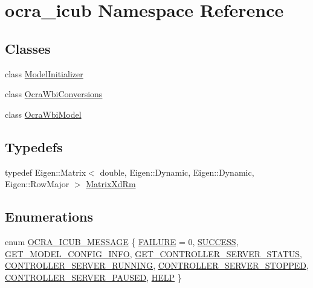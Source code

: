 \hypertarget{namespaceocra__icub}{}\section{ocra\+\_\+icub Namespace Reference}
\label{namespaceocra__icub}
\subsection*{Classes}
\begin{DoxyCompactItemize}
\item 
class \hyperlink{classocra__icub_1_1ModelInitializer}{Model\+Initializer}
\item 
class \hyperlink{classocra__icub_1_1OcraWbiConversions}{Ocra\+Wbi\+Conversions}
\item 
class \hyperlink{classocra__icub_1_1OcraWbiModel}{Ocra\+Wbi\+Model}
\end{DoxyCompactItemize}
\subsection*{Typedefs}
\begin{DoxyCompactItemize}
\item 
typedef Eigen\+::\+Matrix$<$ double, Eigen\+::\+Dynamic, Eigen\+::\+Dynamic, Eigen\+::\+Row\+Major $>$ \hyperlink{namespaceocra__icub_aa5e36a19ed031c28ca83c207bd7dd83f}{Matrix\+Xd\+Rm}
\end{DoxyCompactItemize}
\subsection*{Enumerations}
\begin{DoxyCompactItemize}
\item 
enum \hyperlink{namespaceocra__icub_afbd2db66b68005fb7cfac19210caf83f}{O\+C\+R\+A\+\_\+\+I\+C\+U\+B\+\_\+\+M\+E\+S\+S\+A\+GE} \{ \newline
\hyperlink{namespaceocra__icub_afbd2db66b68005fb7cfac19210caf83faa0c1832978fad84ef108d48265af68d2}{F\+A\+I\+L\+U\+RE} = 0, 
\hyperlink{namespaceocra__icub_afbd2db66b68005fb7cfac19210caf83fa67c96e3afcb39533f69c97dc5e9734e5}{S\+U\+C\+C\+E\+SS}, 
\hyperlink{namespaceocra__icub_afbd2db66b68005fb7cfac19210caf83fae8fe02f5f3b1b11d4749e720b9ec3636}{G\+E\+T\+\_\+\+M\+O\+D\+E\+L\+\_\+\+C\+O\+N\+F\+I\+G\+\_\+\+I\+N\+FO}, 
\hyperlink{namespaceocra__icub_afbd2db66b68005fb7cfac19210caf83fa772ab917d1ff28db029af9271208a69a}{G\+E\+T\+\_\+\+C\+O\+N\+T\+R\+O\+L\+L\+E\+R\+\_\+\+S\+E\+R\+V\+E\+R\+\_\+\+S\+T\+A\+T\+US}, 
\newline
\hyperlink{namespaceocra__icub_afbd2db66b68005fb7cfac19210caf83fa5dee3cfa0ab6c29f5546bc9e30c0aef5}{C\+O\+N\+T\+R\+O\+L\+L\+E\+R\+\_\+\+S\+E\+R\+V\+E\+R\+\_\+\+R\+U\+N\+N\+I\+NG}, 
\hyperlink{namespaceocra__icub_afbd2db66b68005fb7cfac19210caf83fafd31e40d18e553fc09105d360455bc49}{C\+O\+N\+T\+R\+O\+L\+L\+E\+R\+\_\+\+S\+E\+R\+V\+E\+R\+\_\+\+S\+T\+O\+P\+P\+ED}, 
\hyperlink{namespaceocra__icub_afbd2db66b68005fb7cfac19210caf83fa48ad7962d035a58257a0381872ce27b1}{C\+O\+N\+T\+R\+O\+L\+L\+E\+R\+\_\+\+S\+E\+R\+V\+E\+R\+\_\+\+P\+A\+U\+S\+ED}, 
\hyperlink{namespaceocra__icub_afbd2db66b68005fb7cfac19210caf83fae7c9fa2563b6c0b14e5b05d1794dac36}{H\+E\+LP}
 \}
\end{DoxyCompactItemize}
